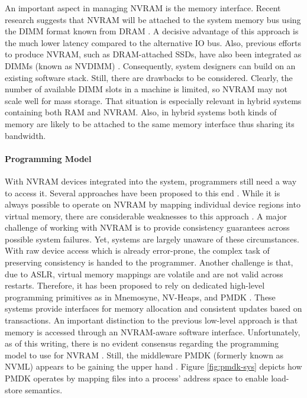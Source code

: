 An important aspect in managing \ac{NVRAM} is the memory interface. Recent
research suggests that \ac{NVRAM} will be attached to the system memory bus
using the \ac{DIMM} format known from \ac{DRAM} \cite{volos2017whisper,
oukid2017data, andrei2017sap}. A decisive advantage of this
approach is the much lower latency compared to the alternative \ac{IO} bus.
Also, previous efforts to produce \ac{NVRAM}, such as DRAM-attached SSDs, have
also been integrated as \acp{DIMM} (known as \ac{NVDIMM})
\cite{dulloor2014system, huang2014design}. Consequently, system designers can
build on an existing software stack. Still, there are drawbacks to be
considered. Clearly, the number of available \ac{DIMM} slots in a machine is
limited, so \ac{NVRAM} may not scale well for mass storage. That situation is
especially relevant in hybrid systems containing both \ac{RAM} and \ac{NVRAM}.
Also, in hybrid systems both kinds of memory are likely to be attached to the
same memory interface thus sharing its bandwidth.

\paragraph{Programming Model}

With \ac{NVRAM} devices integrated into the system, programmers still need a way
to access it. Several approaches have been proposed to this end
\cite{volos2017whisper}. While it is always possible to operate on \ac{NVRAM} by
mapping individual device regions into virtual memory, there are considerable
weaknesses to this approach \cite{condit2009better, volos2011mnemosyne,
dulloor2014system, volos2017whisper}. A major challenge of working with
\ac{NVRAM} is to provide consistency guarantees across possible system failures.
Yet, systems are largely unaware of these circumstances. With raw device access
which is already error-prone, the complex task of preserving consistency is
handed to the programmer. Another challenge is that, due to \ac{ASLR}, virtual
memory mappings are volatile and are not valid across restarts. Therefore, it
has been proposed to rely on dedicated high-level programming primitives as in
Mnemosyne, NV-Heaps, and PMDK \cite{volos2011mnemosyne, coburn2011nv_heaps,
rudoff2017persistent}. These systems provide interfaces for memory allocation
and consistent updates based on transactions. An important distinction to the
previous low-level approach is that memory is accessed through an
\ac{NVRAM}-aware software interface. Unfortunately, as of this writing, there is
no evident consensus regarding the programming model to use for \ac{NVRAM}
\cite{boehm2016persistence}. Still, the middleware PMDK (formerly known as NVML)
appears to be gaining the upper hand \cite{oukid2017data, volos2017whisper,
malinowski2017using, andrei2017sap}. Figure \ref{fig:pmdk-sys} depicts how PMDK
operates by mapping files into a process' address space to enable load-store
semantics.

